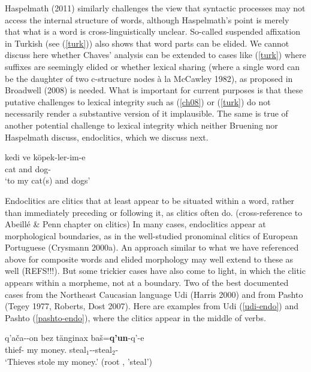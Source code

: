 \documentclass[output=paper]{langsci/langscibook}
\begin{document}
Haspelmath (2011) similarly challenges the view that syntactic processes may not access the internal structure of words, although Haspelmath's point is merely that what is a word is cross-linguistically unclear. So-called suspended affixation in Turkish (see (\ref{turk})) also shows that word parts can be elided. We cannot discuss here whether Chaves' analysis can be extended to cases like (\ref{turk}) where suffixes are seemingly elided or whether lexical sharing (where a single word can be the daughter of two c-structure nodes \`a la McCawley 1982), as proposed in Broadwell (2008) is needed. What is important for current purposes is that these putative challenges to lexical integrity such as (\ref{ch08}) or (\ref{turk}) do not necessarily render a substantive version of it implausible. The same is true of another potential challenge to lexical integrity which neither Bruening nor Haspelmath discuss, endoclitics, which we discuss next.

\begin{exe}
 \ex\label{turk}
 \gll kedi ve köpek-ler-im-e \\
 cat and dog- \\
 \glt `to my cat(s) and dogs'	
 \end{exe}



Endoclitics are clitics that at least appear to be situated within a word, rather than immediately preceding or following it, as clitics often do. (cross-reference to Abeill\'{e} \& Penn chapter on clitics)
In many cases, endoclitics appear at morphological boundaries, as in the well-studied pronominal clitics of European Portuguese (Crysmann 2000a).
An approach similar to what we have referenced above for composite words and elided morphology may well extend to these as well (REFS!!!).
But some trickier cases have also come to light, in which the clitic appears within a morpheme, not at a boundary.
Two of the best documented cases from the Northeast Caucasian language Udi (Harris 2000) and from Pashto (Tegey 1977, Roberts, Dost 2007).
Here are examples from Udi (\ref{udi-endo}) and Pashto (\ref{pashto-endo}), where the clitics appear in the middle of verbs.

\begin{exe}
 \ex\label{udi-endo}
 \gll q'a\v{c}a--on bez t\"{a}nginax ba\v{s}=\textbf{q'un}-q'-e \\
 thief- my money. steal$_{1}$--steal$_{2}$- \\
 \glt `Thieves stole my money.' (root , 'steal')
\end{exe}
\end{document}
